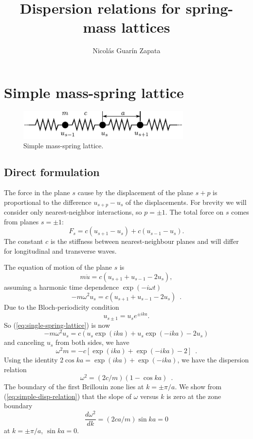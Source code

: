 \documentclass[12pt,letterpaper]{article}
\author{Nicol\'as Guar\'in Zapata}
\title{\textbf{Dispersion relations for spring-mass lattices}}
\begin{document}
\maketitle

\section{Simple mass-spring lattice}
\begin{figure}[h]
\centering
\includegraphics[height=1.5cm]{img/spring-mass.pdf} 
\caption{Simple mass-spring lattice.}
\end{figure}
\subsection{Direct formulation}
The force in the plane $s$ cause by the displacement of the plane $s+p$ is proportional to the difference $u_{s+p}-u_s$ of the displacements. For brevity we will consider only nearest-neighbor interactions, so $p=\pm 1$. The total force on $s$ comes from planes $s=\pm 1$:
\begin{equation}
F_s = c(u_{s+1}-u_s)+ c(u_{s-1}-u_s).
\end{equation}
The constant $c$ is the stiffness between nearest-neighbour planes and will differ for longitudinal and transverse waves.

The equation of motion of the plane $s$ is
\[ m  \ddot{u} = c(u_{s+1} + u_{s-1} -2 u_s), \]
assuming a harmonic time dependence $\exp(-i\omega t)$
\begin{equation}
-m\omega^2 u_s = c(u_{s+1} + u_{s-1} - 2u_s) \enspace .
\label{eq:single-spring-lattice}
\end{equation}
Due to the Bloch-periodicity condition
\[u_{s\pm 1} = u_s e^{\pm i ka}. \]
So (\ref{eq:single-spring-lattice}) is now
\[ -m \omega^2 u_s = c (u_s \exp(ika) + u_s \exp(-ika) - 2u_s) \]
and canceling $u_s$ from both sides, we have
\[ \omega^2 m = -c[ \exp(ika) + \exp(-ika) - 2 ] \enspace .\]
Using the identity $2\cos ka = \exp(ika) + \exp(-ika)$, we have the dispersion relation
\begin{equation}
\omega^2 = (2c/m) (1-\cos ka) \enspace .
\label{eq:simple-disp-relation}
\end{equation}
The boundary of the first Brillouin zone lies at $k=\pm \pi/a$. We show from (\ref{eq:simple-disp-relation}) that the slope of $\omega$ versus $k$ is zero at the zone boundary
\[ \frac{d\omega^2}{dk} = (2ca/m)\sin ka=0\]
at $k=\pm \pi/a$, $\sin ka = 0$.
\end{document}
